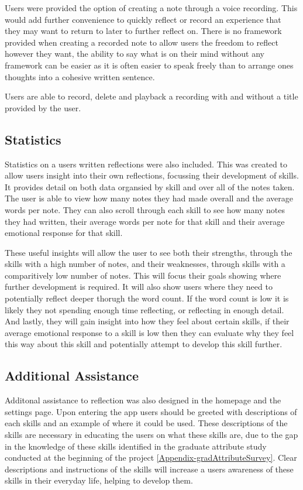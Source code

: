 \documentclass{l4proj}
\begin{document}
Users were provided the option of creating a note through a voice recording. This would add further convenience to quickly reflect or record an experience that they may want to return to later to further reflect on. There is no framework provided when creating a recorded note to allow users the freedom to reflect however they want, the ability to say what is on their mind without any framework can be easier as it is often easier to speak freely than to arrange ones thoughts into a cohesive written sentence. 

Users are able to record, delete and playback a recording with and without a title provided by the user. 

\subsection{Statistics}

Statistics on a users written reflections were also included. This was created to allow users insight into their own reflections, focussing their development of skills. It provides detail on both data organsied by skill and over all of the notes taken. The user is able to view how many notes they had made overall and the average words per note. They can also scroll through each skill to see how many notes they had written, their average words per note for that skill and their average emotional response for that skill. 

These useful insights will allow the user to see both their strengths, through the skills with a high number of notes, and their weaknesses, through skills with a comparitively low number of notes. This will focus their goals showing where further development is required. It will also show users where they need to potentially reflect deeper thorugh the word count. If the word count is low it is likely they not spending enough time reflecting, or reflecting in enough detail. And lastly, they will gain insight into how they feel about certain skills, if their average emotional response to a skill is low then they can evaluate why they feel this way about this skill and potentially attempt to develop this skill further.

\subsection{Additional Assistance}

Additonal assistance to reflection was also designed in the homepage and the settings page. Upon entering the app users should be greeted with descriptions of each skills and an example of where it could be used. These descriptions of the skills are necessary in educating the users on what these skills are, due to the gap in the knowledge of these skills identified in the graduate attribute study conducted at the beginning of the project \ref{Appendix-gradAttributeSurvey}. Clear descriptions and instructions of the skills will increase a users awareness of these skills in their everyday life, helping to develop them.
\end{document}
